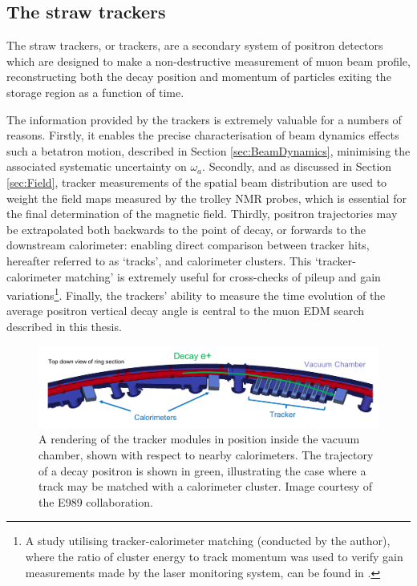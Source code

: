 
\subsection{The straw trackers}\label{subsec:Trackers}

The straw trackers, or trackers, are a secondary system of positron detectors which are designed to make a non-destructive measurement of muon beam profile, reconstructing both the decay position and momentum of particles exiting the storage region as a function of time.

The information provided by the trackers is extremely valuable for a numbers of reasons. Firstly, it enables the precise characterisation of beam dynamics effects such a betatron motion, described in Section \ref{sec:BeamDynamics}, minimising the associated systematic uncertainty on $\omega_{a}$. Secondly, and as discussed in Section \ref{sec:Field}, tracker measurements of the spatial beam distribution are used to weight the field maps measured by the trolley NMR probes, which is essential for the final determination of the magnetic field. Thirdly, positron trajectories may be extrapolated both backwards to the point of decay, or forwards to the downstream calorimeter: enabling direct comparison between tracker hits, hereafter referred to as `tracks', and calorimeter clusters. This `tracker-calorimeter matching' is extremely useful for cross-checks of pileup and gain variations\footnote{A study utilising tracker-calorimeter matching (conducted by the author), where the ratio of cluster energy to track momentum was used to verify gain measurements made by the laser monitoring system, can be found in \cite{EpNote}.}. Finally, the trackers' ability to measure the time evolution of the average positron vertical decay angle is central to the muon EDM search described in this thesis.

\begin{figure}[t!]
\centering{}
\includegraphics[trim={0 0 0 0},clip,width=\textwidth]{Images/Chapter3/TrackerVacChamber.png}
\caption{A rendering of the tracker modules in position inside the vacuum chamber, shown with respect to nearby calorimeters. The trajectory of a decay positron is shown in green, illustrating the case where a track may be matched with a calorimeter cluster. Image courtesy of the E989 collaboration.}
\label{fig:TrackerSchematic}
\end{figure} 

